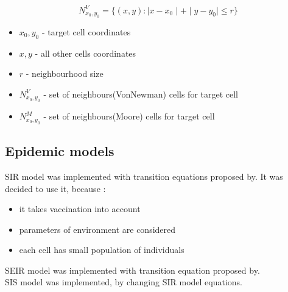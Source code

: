 \documentclass[a4paper, 11pt]{article}
\begin{document}
\begin{equation}
	N^{V}_{x_0,y_0}=\{ \left(x,y\right): \mid x-x_0 \mid + \mid y-y_0 \mid \leq r   \} 
\end{equation}

\begin{itemize}
	\item $x_0,y_0$ - target cell coordinates
	\item $x,y$ - all other cells coordinates
	\item $r$ - neighbourhood size	
	\item $N^{V}_{x_0,y_0}$ - set of neighbours(VonNewman) cells for target cell
	\item $N^{M}_{x_0,y_0}$ - set of neighbours(Moore) cells for target cell
\end{itemize}

\subsection{Epidemic models}

SIR model was implemented with transition equations proposed by\cite{WHITE}. It was decided to use it, because :\\
\begin{itemize}
\item it takes vaccination into account
\item parameters of environment are considered
\item each cell has small population of individuals
\end{itemize}

SEIR model was implemented with transition equation proposed by\cite{cisse}.\\

SIS model was implemented, by changing SIR model equations.\\

\end{document}
